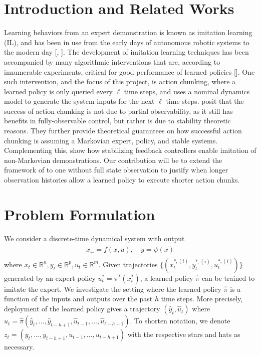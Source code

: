 \documentclass{l4dc2026}
\newcommand{\R}{\mathbb{R}}
\newcommand{\eqspnoan}[2]{\begin{align}\tag{#1}\begin{split} #2 \end{split}\end{align}}
\begin{document}
\section{Introduction and Related Works}
Learning behaviors from an expert demonstration is known as imitation learning (IL), and has been in use from the early days of autonomous robotic systems to the modern day [\cite{ALVINN}, \cite{zhao2023learningfinegrainedbimanualmanipulation}]. The development of imitation learning techniques has been accompanied by many algorithmic interventions that are, according to innumerable experiments, critical for good performance of learned policies [\cite{zhang2025actionchunkingexploratorydata}]. One such intervention, and the focus of this project, is action chunking, where a learned policy is only queried every $\ell$ time steps, and uses a nominal dynamics model to generate the system inputs for the next $\ell$ time steps. \cite{zhang2025actionchunkingexploratorydata} posit that the success of action chunking is not due to partial observability, as it still has benefits in fully-observable control, but rather is due to stability theoretic reasons. They further provide theoretical guarantees on how successful action chunking is assuming a Markovian expert, policy, and stable systems. Complementing this, \citet{block2023provable} show how stabilizing feedback controllers enable imitation of non-Markovian demonstrations. Our contribution will be to extend the framework of \cite{zhang2025actionchunkingexploratorydata} to one without full state observation to justify when longer observation histories allow a learned policy to execute shorter action chunks.

\section{Problem Formulation}
We consider a discrete-time dynamical system with output \eqspnoan{DS}{x_+ = f(x, u), \quad y = \psi(x)\label{DS}}
where $x_t \in \R^n, y_t \in \R^p, u_t \in \R^m$. Given trajectories $\{(x^{*, (i)}_t, y^{*, (i)}_t, u^{*, (i)}_t)\}$ generated by an expert policy $u^*_t = \pi^*(x^*_t)$, a learned policy $\hat{\pi}$ can be trained to imitate the expert. We investigate the setting where the learned policy $\hat\pi$ is a function of the inputs and outputs over the past $h$ time steps. More precisely, deployment of the learned policy gives a trajectory $(\hat y_t, \hat u_t)$ where $\hat u_t = \hat\pi(\hat y_t, ..., \hat y_{t - h + 1}, \hat u_{t-1}, ..., \hat u_{t - h + 1})$. To shorten notation, we denote $z_t = (y_t, ..., y_{t - h + 1}, u_{t-1}, ..., u_{t - h + 1})$ with the respective stars and hats as necessary. 
\end{document}
